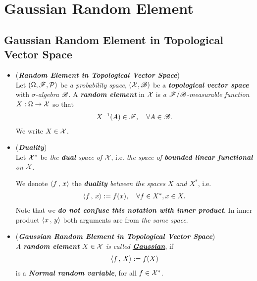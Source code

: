 \documentclass[11pt]{article}
\begin{document}
\section{Gaussian Random Element}
\subsection{Gaussian Random Element in Topological Vector Space}
\begin{itemize}
\item  \begin{definition} (\emph{\textbf{Random Element in Topological Vector Space}})\\
Let $(\Omega, {\mathscr F}, {\mathcal P})$ be \emph{a probability space},  $({\mathcal X}, {\mathscr B})$ be a \emph{\textbf{topological vector space}} with \emph{$\sigma$-algebra} ${\mathscr B}$. 
A \emph{\textbf{random element}} in ${\mathcal X}$  is \emph{a ${\mathscr F}/{\mathscr B}$-measurable function} $X: \Omega \to {\mathcal X}$ so that 
\begin{align*}
X^{-1}(A) \in {\mathscr F}, \quad \forall A \in {\mathscr B}.
\end{align*} We write $X \in {\mathcal X}$.
\end{definition}

\item \begin{definition} (\emph{\textbf{Duality}})\\
Let ${\mathcal X}^{*}$ be \emph{the \textbf{dual} space of ${\mathcal X}$}, i.e. \emph{the space of \textbf{bounded linear functional} on ${\mathcal X}$}. 

We denote $\left\langle f\,,\, x \right\rangle$ the \emph{\textbf{duality} between the spaces $X$ and $X^{*}$}, i.e. 
\begin{align*}
\left\langle f\,,\, x \right\rangle := f(x), \quad \forall f \in X^{*}, x \in X.
\end{align*} Note that we \emph{\textbf{do not confuse this notation with inner product}}. In inner product $\left\langle x\,,\, y \right\rangle$ both arguments are from \emph{the same space}.
\end{definition}

\item \begin{definition} (\emph{\textbf{Gaussian Random Element in Topological Vector Space}})\\
\emph{A \textbf{random element} $X \in {\mathcal X}$ is called \underline{\textbf{Gaussian}}}, if 
\begin{align*}
\left\langle f\,,\, X \right\rangle := f(X) 
\end{align*}  is a \textbf{\emph{Normal random variable}}, for all  $f \in {\mathcal X}^{*}$.
\end{definition}


\end{itemize}
\end{document}
